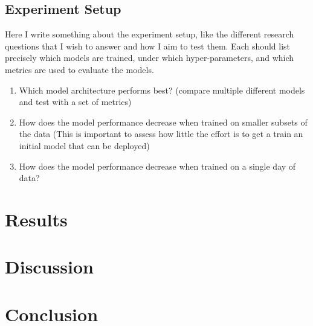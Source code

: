 \documentclass{article}
\begin{document}

  \subsection{Experiment Setup} %
  \label{sub:experiment-setup}

  Here I write something about the experiment setup, like the different
  research questions that I wish to answer and how I aim to test them. Each
  should list precisely which models are trained, under which hyper-parameters,
  and which metrics are used to evaluate the models.

  \begin{enumerate}
    \item Which model architecture performs best? (compare multiple different
      models and test with a set of metrics)
    \item How does the model performance decrease when trained on smaller
      subsets of the data (This is important to assess how little the effort is
      to get a train an initial model that can be deployed)
    \item How does the model performance decrease when trained on a single day
      of data?
  \end{enumerate}
  


  \section{Results} %
  \label{sec:results}


  \section{Discussion} %
  \label{sec:discussion}


  \section{Conclusion} %
  \label{sec:conclusion}


  \newpage
  
  
\end{document}
